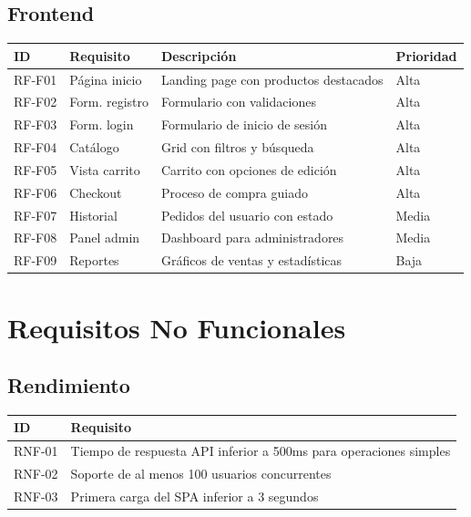 \documentclass[12pt,a4paper]{article}
\begin{document}
\subsection{Frontend}
\begin{longtable}{llp{7cm}l}
\toprule
\textbf{ID} & \textbf{Requisito} & \textbf{Descripci\'on} & \textbf{Prioridad} \\
\midrule
\endhead
RF-F01 & P\'agina inicio & Landing page con productos destacados & Alta \\
RF-F02 & Form. registro & Formulario con validaciones & Alta \\
RF-F03 & Form. login & Formulario de inicio de sesi\'on & Alta \\
RF-F04 & Cat\'alogo & Grid con filtros y b\'usqueda & Alta \\
RF-F05 & Vista carrito & Carrito con opciones de edici\'on & Alta \\
RF-F06 & Checkout & Proceso de compra guiado & Alta \\
RF-F07 & Historial & Pedidos del usuario con estado & Media \\
RF-F08 & Panel admin & Dashboard para administradores & Media \\
RF-F09 & Reportes & Gr\'aficos de ventas y estad\'isticas & Baja \\
\bottomrule
\end{longtable}

\newpage
\section{Requisitos No Funcionales}

\subsection{Rendimiento}
\begin{table}[H]
\centering
\begin{tabularx}{\textwidth}{lX}
\toprule
\textbf{ID} & \textbf{Requisito} \\
\midrule
RNF-01 & Tiempo de respuesta API inferior a 500ms para operaciones simples \\
RNF-02 & Soporte de al menos 100 usuarios concurrentes \\
RNF-03 & Primera carga del SPA inferior a 3 segundos \\
\bottomrule
\end{tabularx}
\end{table}
\end{document}
